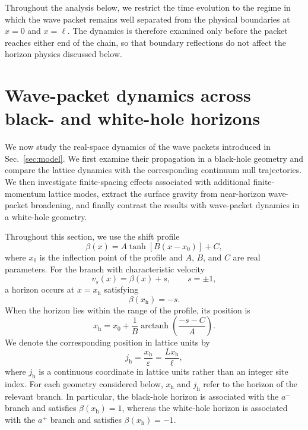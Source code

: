 \documentclass[reprint,amsmath,amssymb,aps,showkeys,superscriptaddress]{revtex4-2}
\begin{document}
Throughout the analysis below, we restrict the time evolution to the
regime in which the wave packet remains well separated from the
physical boundaries at $x=0$ and $x=\ell$. The dynamics is therefore
examined only before the packet reaches either end of the chain, so
that boundary reflections do not affect the horizon physics discussed
below.

\section{Wave-packet dynamics across black- and white-hole horizons}
\label{sec:dynamics}

We now study the real-space dynamics of the wave packets introduced
in Sec.~\ref{sec:model}. We first examine their propagation in a
black-hole geometry and compare the lattice dynamics with the
corresponding continuum null trajectories. We then investigate
finite-spacing effects associated with additional finite-momentum
lattice modes, extract the surface gravity from near-horizon
wave-packet broadening, and finally contrast the results with
wave-packet dynamics in a white-hole geometry.

Throughout this section, we use the shift profile
\begin{equation}
  \beta(x)
  =
  A\tanh\left[B(x-x_0)\right]+C,
  \label{eq:beta_profile}
\end{equation}
where $x_0$ is the inflection point of the profile and $A$, $B$,
and $C$ are real parameters. For the branch with characteristic velocity
\begin{equation}
  v_s(x)=\beta(x)+s,
  \qquad
  s=\pm1,
\end{equation}
a horizon occurs at $x=x_{\mathrm h}$ satisfying
\begin{equation}
  \beta(x_{\mathrm h})=-s.
  \label{eq:general_horizon_condition}
\end{equation}
When the horizon lies within the range of the profile, its position
is
\begin{equation}
  x_{\mathrm h}
  =
  x_0
  +
  \frac{1}{B}
  \operatorname{arctanh}
  \left(
    \frac{-s-C}{A}
  \right).
  \label{eq:horizon_position}
\end{equation}
We denote the corresponding position in lattice units by
\begin{equation}
  j_{\mathrm h}
  =
  \frac{x_{\mathrm h}}{\varepsilon}
  =
  \frac{Lx_{\mathrm h}}{\ell},
  \label{eq:lattice_horizon_position}
\end{equation}
where $j_{\mathrm h}$ is a continuous coordinate in lattice units
rather than an integer site index. For each geometry considered
below, $x_{\mathrm h}$ and $j_{\mathrm h}$ refer to the horizon of
the relevant branch. In particular, the black-hole horizon is
associated with the $a^-$ branch and satisfies
$\beta(x_{\mathrm h})=1$, whereas the white-hole horizon is
associated with the $a^+$ branch and satisfies
$\beta(x_{\mathrm h})=-1$.
\end{document}

